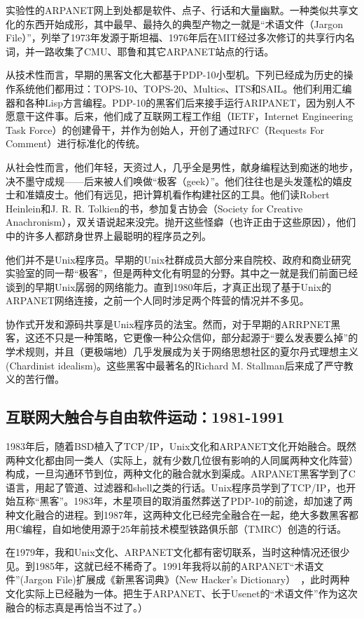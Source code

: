 \documentclass[12pt,oneside]{ctexbook}
\begin{document}
\begin{common-format}
实验性的ARPANET网上到处都是软件、点子、行话和大量幽默。一种类似共享文化的东西开始成形，其中最早、最持久的典型产物之一就是“术语文件（Jargon File）”，列举了1973年发源于斯坦福、1976年后在MIT经过多次修订的共享行内名词，并一路收集了CMU、耶鲁和其它ARPANET站点的行话。

从技术性而言，早期的黑客文化大都基于PDP-10小型机。下列已经成为历史的操作系统他们都用过：TOPS-10、TOPS-20、Multics、ITS和SAIL。他们利用汇编器和各种Lisp方言编程。PDP-10的黑客们后来接手运行ARIPANET，因为别人不愿意干这件事。后来，他们成了互联网工程工作组（IETF，Internet Engineering Task Force）的创建骨干，并作为创始人，开创了通过RFC（Requests For Comment）进行标准化的传统。

从社会性而言，他们年轻，天资过人，几乎全是男性，献身编程达到痴迷的地步，决不墨守成规——后来被人们唤做“极客（geek）”。他们往往也是头发蓬松的嬉皮士和准嬉皮士。他们有远见，把计算机看作构建社区的工具。他们读Robert Heinlein和J. R. R. Tolkien的书，参加复古协会（Society for Creative Anachronism），双关语说起来没完。抛开这些怪癖（也许正由于这些原因），他们中的许多人都跻身世界上最聪明的程序员之列。

他们并不是Unix程序员。早期的Unix社群成员大部分来自院校、政府和商业研究实验室的同一帮“极客”，但是两种文化有明显的分野。其中之一就是我们前面已经谈到的早期Unix孱弱的网络能力。直到1980年后，才真正出现了基于Unix的ARPANET网络连接，之前一个人同时涉足两个阵营的情况并不多见。

协作式开发和源码共享是Unix程序员的法宝。然而，对于早期的ARRPNET黑客，这还不只是一种策略，它更像一种公众信仰，部分起源于“要么发表要么掉”的学术规则，并且（更极端地）几乎发展成为关于网络思想社区的夏尔丹式理想主义(Chardinist idealism)。这些黑客中最著名的Richard M. Stallman后来成了严守教义的苦行僧。

\subsection{互联网大触合与自由软件运动：1981-1991}
1983年后，随着BSD植入了TCP/IP，Unix文化和ARPANET文化开始融合。既然两种文化都由同一类人（实际上，就有少数几位很有影响的人同属两种文化阵营）构成，一旦沟通环节到位，两种文化的融合就水到渠成。ARPANET黑客学到了C语言，用起了管道、过滤器和shell之类的行话。Unix程序员学到了TCP/IP，也开始互称“黑客”。1983年，木星项目的取消虽然葬送了PDP-10的前途，却加速了两种文化融合的进程。到1987年，这两种文化已经完全融合在一起，绝大多数黑客都用C编程，自如地使用源于25年前技术模型铁路俱乐部（TMRC）创造的行话。

在1979年，我和Unix文化、ARPANET文化都有密切联系，当时这种情况还很少见。到1985年，这就已经不稀奇了。1991年我将以前的ARPANET“术语文件”(Jargon File)扩展成《新黑客词典》（New Hacker's Dictionary）~\cite{Raymond96}，此时两种文化实际上已经融为一体。把生于ARPANET、长于Usenet的“术语文件”作为这次融合的标志真是再恰当不过了。）


\end{common-format}
\end{document}
